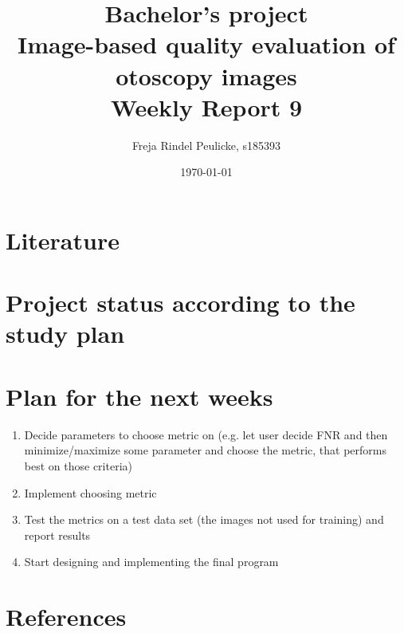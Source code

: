 \documentclass[10pt,a4paper]{article}
\title{{Bachelor's project\\[0.5em]}
       {\bf \huge Image-based quality evaluation of otoscopy images\\[0.5em]}
       {\bf Weekly Report 9}}
\author{Freja Rindel Peulicke, s185393}
\date{\today}
\begin{document}
\maketitle

\section*{Literature}




\newpage
\section*{Project status according to the study plan}




\section*{Plan for the next weeks}

\begin{enumerate}
\item Decide parameters to choose metric on (e.g. let user decide FNR and then minimize/maximize some parameter and choose the metric, that performs best on those criteria)
\item Implement choosing metric
\item Test the metrics on a test data set (the images not used for training) and report results
\item Start designing and implementing the final program
\end{enumerate}



\section*{References}
\printbibliography[type=online,title={Code downloads}]
\printbibliography[type=book,title={Books}]
\printbibliography[type=article,title={Articles}]
\end{document}
